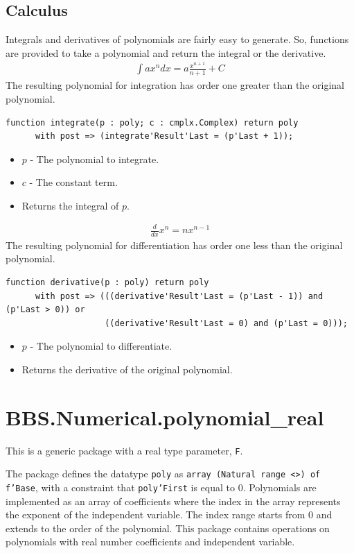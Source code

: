 \documentclass[10pt, openany]{book}
\newcommand{\indexfunc}[1]{\index[func]{#1}}
\newcommand{\datatype}[1]{\texttt{#1}}
\begin{document}
\subsection{Calculus}
Integrals and derivatives of polynomials are fairly easy to generate.  So, functions are provided to take a polynomial and return the integral or the derivative.
\begin{align*}
  \int ax^n dx = a\frac{x^{n+1}}{n+1}+C
\end{align*}
The resulting polynomial for integration has order one greater than the original polynomial.
\begin{lstlisting}
function integrate(p : poly; c : cmplx.Complex) return poly
      with post => (integrate'Result'Last = (p'Last + 1));
\end{lstlisting}
\indexfunc{poly-integrate}
\begin{itemize}
  \item $p$ - The polynomial to integrate.
  \item $c$ - The constant term.
  \item Returns the integral of $p$.
\end{itemize}

\begin{align*}
  \frac{d}{dx}x^n = n x^{n-1}
\end{align*}
The resulting polynomial for differentiation has order one less than the original polynomial.
\begin{lstlisting}
function derivative(p : poly) return poly
      with post => (((derivative'Result'Last = (p'Last - 1)) and (p'Last > 0)) or
                    ((derivative'Result'Last = 0) and (p'Last = 0)));
\end{lstlisting}
\indexfunc{poly-derivative}
\begin{itemize}
  \item $p$ - The polynomial to differentiate.
  \item Returns the derivative of the original polynomial.
\end{itemize}

\section{BBS.Numerical.polynomial\_real}
This is a generic package with a real type parameter, \datatype{F}.

The package defines the datatype \datatype{poly} as \datatype{array (Natural range  <>) of f'Base}, with a constraint that \datatype{poly'First} is equal to 0.  Polynomials are implemented as an array of coefficients where the index in the array represents the exponent of the independent variable.  The index range starts from 0 and extends to the order of the polynomial.  This package contains operations on polynomials with real number coefficients and independent variable.
\end{document}
